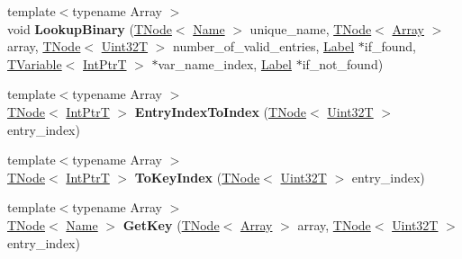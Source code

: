 \begin{DoxyCompactItemize}
{\footnotesize template$<$typename Array $>$ }\\void {\bfseries Lookup\+Binary} (\mbox{\hyperlink{classv8_1_1internal_1_1compiler_1_1TNode}{T\+Node}}$<$ \mbox{\hyperlink{classv8_1_1internal_1_1Name}{Name}} $>$ unique\+\_\+name, \mbox{\hyperlink{classv8_1_1internal_1_1compiler_1_1TNode}{T\+Node}}$<$ \mbox{\hyperlink{classv8_1_1Array}{Array}} $>$ array, \mbox{\hyperlink{classv8_1_1internal_1_1compiler_1_1TNode}{T\+Node}}$<$ \mbox{\hyperlink{structv8_1_1internal_1_1Uint32T}{Uint32T}} $>$ number\+\_\+of\+\_\+valid\+\_\+entries, \mbox{\hyperlink{classv8_1_1internal_1_1compiler_1_1CodeAssemblerLabel}{Label}} $\ast$if\+\_\+found, \mbox{\hyperlink{classv8_1_1internal_1_1compiler_1_1TypedCodeAssemblerVariable}{T\+Variable}}$<$ \mbox{\hyperlink{structv8_1_1internal_1_1IntPtrT}{Int\+PtrT}} $>$ $\ast$var\+\_\+name\+\_\+index, \mbox{\hyperlink{classv8_1_1internal_1_1compiler_1_1CodeAssemblerLabel}{Label}} $\ast$if\+\_\+not\+\_\+found)
\item 
\mbox{\label{classv8_1_1internal_1_1CodeStubAssembler_a2969e7b460a504b645938aade74473ce}} 
{\footnotesize template$<$typename Array $>$ }\\\mbox{\hyperlink{classv8_1_1internal_1_1compiler_1_1TNode}{T\+Node}}$<$ \mbox{\hyperlink{structv8_1_1internal_1_1IntPtrT}{Int\+PtrT}} $>$ {\bfseries Entry\+Index\+To\+Index} (\mbox{\hyperlink{classv8_1_1internal_1_1compiler_1_1TNode}{T\+Node}}$<$ \mbox{\hyperlink{structv8_1_1internal_1_1Uint32T}{Uint32T}} $>$ entry\+\_\+index)
\item 
\mbox{\label{classv8_1_1internal_1_1CodeStubAssembler_a5c1f89a3cc4683dffeeb52c3146a06bf}} 
{\footnotesize template$<$typename Array $>$ }\\\mbox{\hyperlink{classv8_1_1internal_1_1compiler_1_1TNode}{T\+Node}}$<$ \mbox{\hyperlink{structv8_1_1internal_1_1IntPtrT}{Int\+PtrT}} $>$ {\bfseries To\+Key\+Index} (\mbox{\hyperlink{classv8_1_1internal_1_1compiler_1_1TNode}{T\+Node}}$<$ \mbox{\hyperlink{structv8_1_1internal_1_1Uint32T}{Uint32T}} $>$ entry\+\_\+index)
\item 
\mbox{\label{classv8_1_1internal_1_1CodeStubAssembler_a5ccd65ce9782cd074e6823417c295e57}} 
{\footnotesize template$<$typename Array $>$ }\\\mbox{\hyperlink{classv8_1_1internal_1_1compiler_1_1TNode}{T\+Node}}$<$ \mbox{\hyperlink{classv8_1_1internal_1_1Name}{Name}} $>$ {\bfseries Get\+Key} (\mbox{\hyperlink{classv8_1_1internal_1_1compiler_1_1TNode}{T\+Node}}$<$ \mbox{\hyperlink{classv8_1_1Array}{Array}} $>$ array, \mbox{\hyperlink{classv8_1_1internal_1_1compiler_1_1TNode}{T\+Node}}$<$ \mbox{\hyperlink{structv8_1_1internal_1_1Uint32T}{Uint32T}} $>$ entry\+\_\+index)

\end{DoxyCompactItemize}
